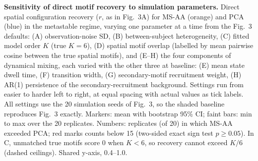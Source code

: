 \caption{\textbf{Sensitivity of direct motif recovery to simulation parameters.}
Direct spatial configuration recovery ($r$, as in Fig.~3A) for MS-AA (orange) and PCA (blue) in the metastable regime, varying one parameter at a time from the Fig.~3 defaults: (A) observation-noise SD, (B) between-subject heterogeneity, (C) fitted model order $K$ (true $K = 6$), (D) spatial motif overlap (labelled by mean pairwise cosine between the true spatial motifs), and (E--H) the four components of dynamical mixing, each varied with the other three at baseline: (E) mean state dwell time, (F) transition width, (G) secondary-motif recruitment weight, (H) AR(1) persistence of the secondary-recruitment background. Settings run from easier to harder left to right, at equal spacing with actual values as tick labels. All settings use the 20 simulation seeds of Fig.~3, so the shaded baseline reproduces Fig.~3 exactly. Markers: mean with bootstrap 95\% CI; faint bars: min to max over the 20 replicates. Numbers: replicates (of 20) in which MS-AA exceeded PCA; red marks counts below 15 (two-sided exact sign test $p \geq 0.05$). In C, unmatched true motifs score 0 when $K < 6$, so recovery cannot exceed $K/6$ (dashed ceilings). Shared y-axis, 0.4--1.0.}
\label{fig:s13}








